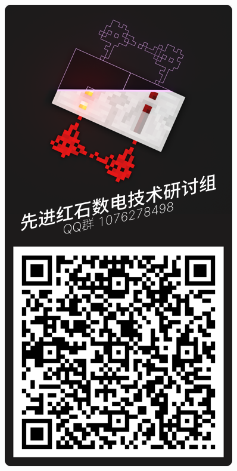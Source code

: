 \documentclass[UTF8,12pt,punct=kaiming,fontset=none]{ctexart}
\begin{document}
\thispagestyle{fancy}
\quad

\begin{figure}
    \vspace{-2cm}
    \includegraphics[width=\linewidth]{qrcode.png}
\end{figure}
\end{document}

